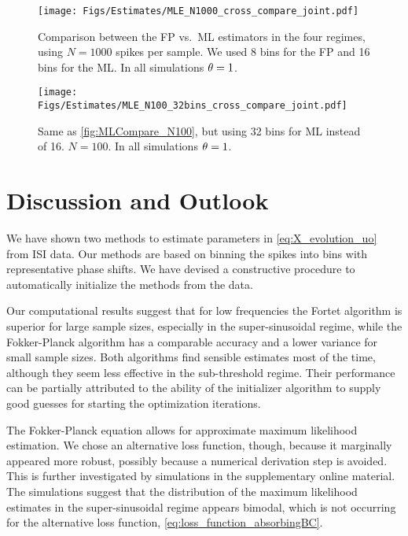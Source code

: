 \begin{figure}[htp]
\begin{center}
  \texttt{[image: Figs/Estimates/MLE\_N1000\_cross\_compare\_joint.pdf]}
  \caption[labelInTOC]{Comparison between the FP vs.\ ML
  estimators in the four regimes, using $N=1000$ spikes per sample. We used 8
  bins for the FP and 16 bins for the ML. In all simulations ${ \theta} = 1$.}
  \label{fig:MLCompare_N1000}
\end{center}
\end{figure} 

\begin{figure}[htp]
\begin{center}
  \texttt{[image: Figs/Estimates/MLE\_N100\_32bins\_cross\_compare\_joint.pdf]}
  \caption{Same as \cref{fig:MLCompare_N100}, but using 32
  bins for ML instead of 16. $N=100$. In all simulations ${ \theta} = 1$.}
  \label{fig:MLCompare_N100_32bins}
\end{center}
\end{figure}



\section{Discussion and Outlook}
We have shown two methods to estimate parameters in
\cref{eq:X_evolution_uo} from ISI data. Our methods are based
on binning the spikes into bins with representative phase shifts. We have
devised a constructive procedure to automatically initialize the methods from
the data.

Our computational results suggest that for low frequencies the Fortet algorithm
is superior for large sample sizes, especially in the super-sinusoidal regime, while the
Fokker-Planck algorithm has a comparable accuracy and a lower variance for small
sample sizes. Both algorithms find sensible estimates most of the time, although
they seem less effective in the sub-threshold regime. Their performance can
be partially attributed to the ability of the initializer algorithm to supply
good guesses for starting the optimization iterations.

The Fokker-Planck equation allows for approximate maximum likelihood
estimation. We chose an alternative loss function, though, because it
marginally appeared more robust, possibly because a numerical derivation
step is avoided. This is further investigated by simulations in the
supplementary online material. The simulations suggest that the
distribution of the maximum likelihood estimates in the super-sinusoidal
regime appears bimodal, which is not occurring for the alternative loss
function, \cref{eq:loss_function_absorbingBC}. %

